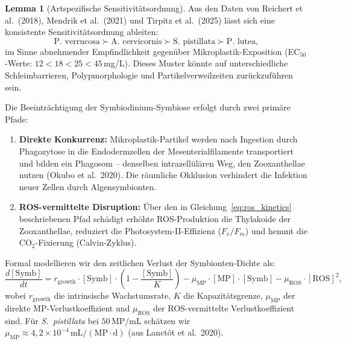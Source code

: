 ﻿\documentclass[12pt,a4paper]{article}
\theoremstyle{definition}
\newtheorem{lemma}{Lemma}[section]
\theoremstyle{remark}
\newcommand{\MP}{Mikroplastik}
\begin{document}
\begin{lemma}[Artspezifische Sensitivit\"atsordnung]
Aus den Daten von Reichert et al.\ (2018), Mendrik et al.\ (2021) und
Tirpitz et al.\ (2025) l\"asst sich eine konsistente Sensitivit\"atsordnung ableiten:
\begin{equation}
  \text{P.~verrucosa} \succ \text{A.~cervicornis} \succ
  \text{S.~pistillata} \succ \text{P.~lutea},
  \label{eq:sensitivity_order}
\end{equation}
im Sinne abnehmender Empfindlichkeit gegen\"uber \MP{}-Exposition (EC$_{50}$-Werte:
$12 < 18 < 25 < 45$\,mg/L). Dieses Muster k\"onnte auf unterschiedliche
Schleimbarrieren, Polypmorphologie und Partikelverweilzeiten zur\"uckzuf\"uhren sein.
\end{lemma}

Die Beeintr\"achtigung der Symbiodinium-Symbiose erfolgt durch zwei prim\"are Pfade:
\begin{enumerate}[leftmargin=*]
  \item \textbf{Direkte Konkurrenz:} Mikroplastik-Partikel werden nach Ingestion
    durch Phagozytose in die Endodermzellen der Mesenterialfilamente transportiert
    und bilden ein Phagosom -- denselben intrazell\"ul\"aren Weg, den Zooxanthellae
    nutzen (Okubo et al.\ 2020). Die r\"aumliche Okklusion verhindert die
    Infektion neuer Zellen durch Algensymbionten.
  \item \textbf{ROS-vermittelte Disruption:} \"Uber den in Gleichung~\eqref{eq:ros_kinetics}
    beschriebenen Pfad sch\"adigt erh\"ohte ROS-Produktion die Thylakoide der
    Zooxanthellae, reduziert die Photosystem-II-Effizienz ($F_v/F_m$) und hemmt
    die CO$_2$-Fixierung (Calvin-Zyklus).
\end{enumerate}

Formal modellieren wir den zeitlichen Verlust der Symbionten-Dichte als:
\begin{equation}
  \frac{d[\text{Symb}]}{dt} = r_{\text{growth}} \cdot [\text{Symb}] \cdot
  \left(1 - \frac{[\text{Symb}]}{K}\right)
  - \mu_{\text{MP}} \cdot [\text{MP}] \cdot [\text{Symb}]
  - \mu_{\text{ROS}} \cdot [\text{ROS}]^2,
  \label{eq:symb_dynamics}
\end{equation}
wobei $r_{\text{growth}}$ die intrinsische Wachstumsrate,
$K$ die Kapazitätsgrenze, $\mu_{\text{MP}}$ der direkte MP-Verlustkoeffizient
und $\mu_{\text{ROS}}$ der ROS-vermittelte Verlustkoeffizient sind.
Für \textit{S.~pistillata} bei $50\,\text{MP/mL}$ sch\"atzen wir
$\mu_{\text{MP}} \approx 4{,}2 \times 10^{-4}\,\text{mL}/(\text{MP}\cdot\text{d})$
(aus Lanct\^{o}t et al.\ 2020).
\end{document}
